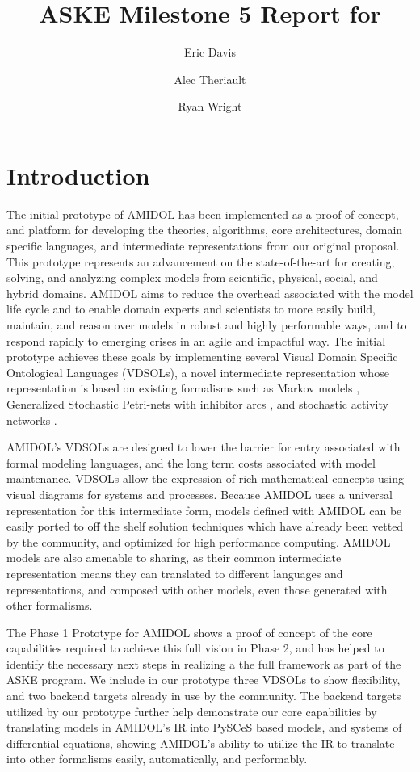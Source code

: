 \documentclass[11pt]{article}
\date{\vspace{-5ex}}
\author[1]{Eric Davis}
\author[1]{Alec Theriault}
\author[1]{Ryan Wright}
\affil[1]{Galois, Inc}
\title{ASKE Milestone 5 Report for \amidol{}}
\newcommand{\amidol}{\textsc{AMIDOL}}
\begin{document}
\maketitle
\vspace{10pt}

\section{Introduction}

The initial prototype of \amidol{} has been implemented as a proof of
concept, and platform for developing the theories, algorithms, core
architectures, domain specific languages, and intermediate
representations from our original proposal.  This prototype represents
an advancement on the state-of-the-art for creating, solving, and
analyzing complex models from scientific, physical, social, and hybrid
domains.  \amidol{} aims to reduce the overhead associated with the
model life cycle and to enable domain experts and scientists to more
easily build, maintain, and reason over models in robust and highly
performable ways, and to respond rapidly to emerging crises in an
agile and impactful way.  The initial prototype achieves these goals
by implementing several Visual Domain Specific Ontological Languages
(VDSOLs), a novel intermediate representation whose representation is
based on existing formalisms such as Markov models
\cite{howard2012dynamic}, Generalized Stochastic Petri-nets with
inhibitor arcs \cite{chiola1993generalized}, and stochastic activity
networks \cite{movaghar1985performability,sanders2000stochastic}.

\amidol{}'s VDSOLs are designed to lower the barrier for entry
associated with formal modeling languages, and the long term costs
associated with model maintenance.  VDSOLs allow the expression of
rich mathematical concepts using visual diagrams for systems and
processes.  Because \amidol{} uses a universal representation for this
intermediate form, models defined with \amidol{} can be easily ported
to off the shelf solution techniques which have already been vetted by
the community, and optimized for high performance computing.
\amidol{} models are also amenable to sharing, as their common
intermediate representation means they can translated to different
languages and representations, and composed with other models, even
those generated with other formalisms.

The Phase 1 Prototype for \amidol{} shows a proof of concept of the
core capabilities required to achieve this full vision in Phase 2, and
has helped to identify the necessary next steps in realizing a the
full framework as part of the ASKE program.  We include in our
prototype three VDSOLs to show flexibility, and two backend targets
already in use by the community.  The backend targets utilized by our
prototype further help demonstrate our core capabilities by
translating models in \amidol{}'s IR into PySCeS based models, and
systems of differential equations, showing \amidol{}'s ability to
utilize the IR to translate into other formalisms easily,
automatically, and performably.
\end{document}
